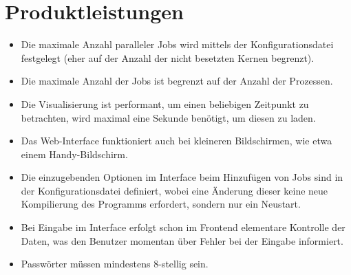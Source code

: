 \section{Produktleistungen}

%
%
%
%
%

\begin{itemize}
    \item Die maximale Anzahl paralleler Jobs wird mittels der Konfigurationsdatei festgelegt (eher auf der Anzahl der nicht besetzten Kernen begrenzt). 
    \item Die maximale Anzahl der Jobs ist begrenzt auf der Anzahl der Prozessen.
    \item Die Visualisierung ist performant, um einen beliebigen Zeitpunkt zu betrachten, wird maximal eine Sekunde benötigt, um diesen zu laden. 
    \item Das Web-Interface funktioniert auch bei kleineren Bildschirmen, wie etwa einem Handy-Bildschirm.
    \item Die einzugebenden Optionen im Interface beim Hinzufügen von Jobs sind in der Konfigurationsdatei definiert, wobei eine Änderung dieser keine neue Kompilierung des Programms erfordert, sondern nur ein Neustart.
    \item Bei Eingabe im Interface erfolgt schon im Frontend elementare Kontrolle der Daten, was den Benutzer momentan über Fehler bei der Eingabe informiert.
    \item Passwörter müssen mindestens 8-stellig sein.

\end{itemize}
